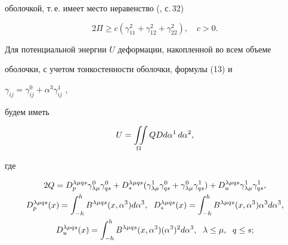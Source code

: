 оболочкой, т.\,е. имеет место неравенство (\cite{1}, с.\,32) 


\begin{equation} 


2\Pi\ge c(\gamma^2_{11}+\gamma^2_{12}+\gamma^2_{22}),\quad c>0. 


\end{equation} 


 


Для потенциальной энергии $U$ деформации, накопленной во всем объеме 


оболочки, с учетом тонкостенности оболочки, формулы (13) и 


$\gamma_{ij}=\gamma^0_{ij}+\alpha^3\gamma^1_{ij}$ \cite{1}, 


будем иметь 


\begin{equation} 


U=\intO QD d\alpha^1\,d\alpha^2, 


\end{equation} 


где 


\begin{gather} 


2Q=D^{\lambda\mu q s}_p\gamma^0_{\lambda\mu}\gamma^0_{q s}+ 


D^{\lambda\mu q s}_* 


(\gamma^1_{\lambda\mu}\gamma^0_{q s}+ 


\gamma^0_{\lambda\mu}\gamma^1_{q s})+ 


D_u^{\lambda\mu q s}\gamma^1_{\lambda\mu} 


\gamma^1_{q s}, \\ 


%


D^{\lambda\mu q s}_p(x)=\int^h_{-h}B^{\lambda\mu q s} 


(x,\alpha^3)d\alpha^3,\ \;


D^{\lambda\mu q s}_*(x)=\int^h_{-h}B^{\lambda\mu q s} 


(x,\alpha^3)\alpha^3d\alpha^3,\notag \\


%


D^{\lambda\mu q s}_u(x)=\int^h_{-h} 


B^{\lambda\mu q s}(x,\alpha^3)(\alpha^3)^2d\alpha^3,\ \;


\lambda\le \mu,\ \;q\le s; \notag


\end{gather} 


